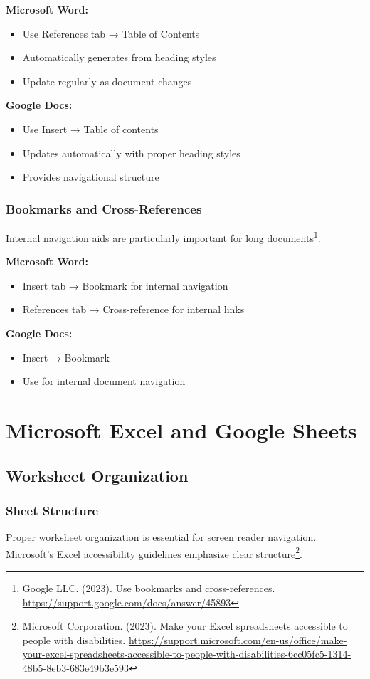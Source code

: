 \textbf{Microsoft Word:}
\begin{itemize}
\item Use References tab → Table of Contents
\item Automatically generates from heading styles
\item Update regularly as document changes
\end{itemize}

\textbf{Google Docs:}
\begin{itemize}
\item Use Insert → Table of contents
\item Updates automatically with proper heading styles
\item Provides navigational structure
\end{itemize}

\subsubsection{Bookmarks and Cross-References}
Internal navigation aids are particularly important for long documents\footnote{Google LLC. (2023). Use bookmarks and cross-references. \url{https://support.google.com/docs/answer/45893}}.

\textbf{Microsoft Word:}
\begin{itemize}
\item Insert tab → Bookmark for internal navigation
\item References tab → Cross-reference for internal links
\end{itemize}

\textbf{Google Docs:}
\begin{itemize}
\item Insert → Bookmark
\item Use for internal document navigation
\end{itemize}

\section{Microsoft Excel and Google Sheets}

\subsection{Worksheet Organization}

\subsubsection{Sheet Structure}
Proper worksheet organization is essential for screen reader navigation. Microsoft's Excel accessibility guidelines emphasize clear structure\footnote{Microsoft Corporation. (2023). Make your Excel spreadsheets accessible to people with disabilities. \url{https://support.microsoft.com/en-us/office/make-your-excel-spreadsheets-accessible-to-people-with-disabilities-6cc05fc5-1314-48b5-8eb3-683e49b3e593}}.

